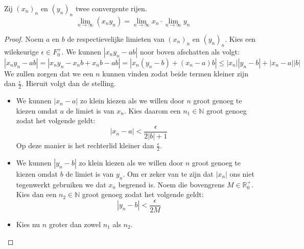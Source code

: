 \documentclass[main.tex]{subfiles}
\begin{document}
\begin{st}
  \label{st:som-van-limieten-is-limiet-van-som}
  Zij $(x_{n})_{n}$ en $(y_{n})_{n}$ twee convergente rijen.
  \[ \lim_{n \rightarrow \infty}(x_{n}y_{n}) = \lim_{n\rightarrow \infty}x_{n} \cdot \lim_{n\rightarrow \infty}y_{n} \]

  \begin{proof}
    Noem $a$ en $b$ de respectievelijke limieten van $(x_{n})_{n}$ en $(y_{n})_{n}$.
    Kies een wilekeurige $\epsilon \in F_{0}^{+}$.
    We kunnen $|x_{n}y_{n}-ab|$ noor boven afschatten als volgt:
    \[ |x_{n}y_{n}-ab| = |x_{n}y_{n} -x_{n}b + x_{n}b -ab| = |x_{n}(y_{n}-b) + (x_{n}-a)b| \le |x_{n}||y_{n}-b| + |x_{n}-a||b| \]
    We zullen zorgen dat we een $n$ kunnen vinden zodat beide termen kleiner zijn dan $\frac{\epsilon}{2}$. Hieruit volgt dan de stelling.
    \begin{itemize}
    \item We kunnen $|x_{n}-a|$ zo klein kiezen als we willen door $n$ groot genoeg te kiezen omdat $a$ de limiet is van $x_{n}$.
      Kies daarom een $n_{1}\in\mathbb{N}$ groot genoeg zodat het volgende geldt:
      \[ |x_{n}-a| < \frac{\epsilon}{2|b|+1} \]
      Op deze manier is het rechterlid kleiner dan $\frac{\epsilon}{2}$.
    \item We kunnen $|y_{n}-b|$ zo klein kiezen als we willen door $n$ groot genoeg te kiezen omdat $b$ de limiet is van $y_{n}$.
      Om er zeker van te zijn dat $|x_{n}|$ ons niet tegenwerkt gebruiken we dat $x_{n}$ begrensd is.
      Noem die bovengrens $M\in\mathbb{R}_{0}^{+}$.
      Kies dan een $n_{2}\in\mathbb{N}$ groot genoeg zodat het volgende geldt:
      \[ |y_{n}-b| < \frac{\epsilon}{2M} \]
    \item Kies nu $n$ groter dan zowel $n_{1}$ als $n_{2}$.
    \end{itemize}
  \end{proof}
\end{st}
\end{document}
